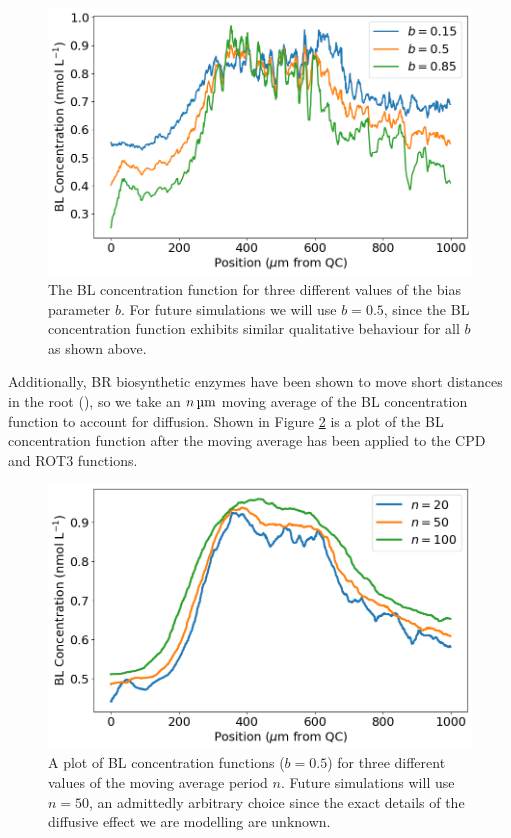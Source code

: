 \begin{figure}[!htbp]
    \centering
    \includegraphics[width=13cm]{img/bl-bias.png}
    \caption{The BL concentration function for three different values of the bias parameter $b$. For future simulations we will use $b = 0.5$, since the BL concentration function exhibits similar qualitative behaviour for all $b$ as shown above.}
    \label{fig:bl-bias}
\end{figure}

\medskip

Additionally, BR biosynthetic enzymes have been shown to move short distances in the root (\cite{vukasinovic2021}), so we take an $n\,\um$ moving average of the BL concentration function to account for diffusion. Shown in Figure \ref{fig:bl-average} is a plot of the BL concentration function after the moving average has been applied to the CPD and ROT3 functions.

\begin{figure}[!htbp]
    \centering
    \includegraphics[width=13cm]{img/bl-average.png}
    \caption{A plot of BL concentration functions ($b = 0.5$) for three different values of the moving average period $n$. Future simulations will use $n = 50$, an admittedly arbitrary choice since the exact details of the diffusive effect we are modelling are unknown.}
    \label{fig:bl-average}
\end{figure}


